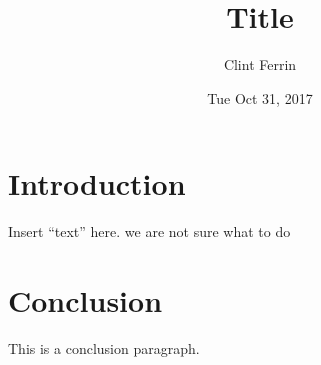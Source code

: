 \title { Title             }
\author{ Clint Ferrin     }
\date  { Tue Oct 31, 2017 }
\def\class{ Neural Networks: ECE 5930 }



    \pageSetup
    \createTitlePage
    \createTableOfContents

   \section{Introduction}\label{sec:intro}
   Insert “text” here.
   we are not sure what to do 

   \section{Conclusion}\label{sec:conclusion}
        This is a conclusion paragraph. 


